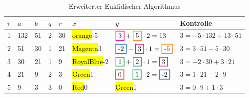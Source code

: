 \begin{table}[h]
  \caption{Erweiterter Euklidischer Algorithmus}
  \centering
  \renewcommand{\arraystretch}{1.4}
  \begin{tabular}{|l|l|l|l|l|l|l|l|}
    \hline
    $i$ & $a$ & $b$ & $q$ & $r$ & $x$                & $y$                                                              & Kontrolle                        \\ \hline
    1   & 132 & 51  & 2   & 30  & \hl{orange}{-5}    & $\hl{Magenta}{3} + \hl{orange}{5} \cdot 2 = 13$                  & $3 = -5 \cdot 132 + 13 \cdot 51$ \\ \hline
    2   & 51  & 30  & 1   & 21  & \hl{Magenta}{3}    & $\hl{RoyalBlue}{-2} - \hl{Magenta}{3} \cdot 1 = \hl{orange}{-5}$ & $3 = 3 \cdot 51 - 5 \cdot 30$    \\ \hline
    3   & 30  & 21  & 1   & 9   & \hl{RoyalBlue}{-2} & $\hl{Green}{1} + \hl{RoyalBlue}{2} \cdot 1 = \hl{Magenta}{3} $   & $3 = -2 \cdot 30 + 3 \cdot 21$   \\ \hline
    4   & 21  & 9   & 2   & 3   & \hl{Green}{1}      & $\hl{Red}{0} - \hl{Green}{1}  \cdot 2 = \hl{RoyalBlue}{-2}$      & $3 = 1 \cdot 21 - 2 \cdot 9$     \\ \hline
    5   & 9   & 3   & 3   & 0   & \hl{Red}{0}        & \hl{Green}{1}                                                    & $3 = 0 \cdot 9 + 1 \cdot 3$      \\ \hline
  \end{tabular}
\end{table}

